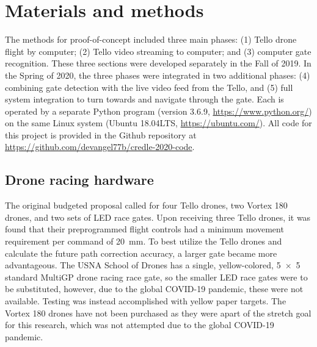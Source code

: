 \section{Materials and methods}
The methods for proof-of-concept included three main phases: (1) Tello drone flight by computer; (2) Tello video streaming to computer; and (3) computer gate recognition. These three sections were developed separately in the Fall of 2019. In the Spring of 2020, the three phases were integrated in two additional phases: (4) combining gate detection with the live video feed from the Tello, and (5) full system integration to turn towards and navigate through the gate. Each is operated by a separate Python program (version 3.6.9, \url{https://www.python.org/}) on the same Linux system (Ubuntu 18.04LTS, \url{https://ubuntu.com/}). All code for this project is provided in the Github repository at \url{https://github.com/devangel77b/credle-2020-code}. 




\subsection{Drone racing hardware}
The original budgeted proposal called for four Tello drones, two Vortex 180 drones, and two sets of LED race gates. Upon receiving three Tello drones, it was found that their preprogrammed flight controls had a minimum movement requirement per command of \SI{20}{\milli\meter}. To best utilize the Tello drones and calculate the future path correction accuracy, a larger gate became more advantageous. The USNA School of Drones has a single, yellow-colored, \SI{5x5}{\foot} standard MultiGP drone racing race gate, so the smaller LED race gates were to be substituted, however, due to the global COVID-19 pandemic, these were not available. Testing was instead accomplished with yellow paper targets. The Vortex 180 drones have not been purchased as they were apart of the stretch goal for this research, which was not attempted due to the global COVID-19 pandemic.





